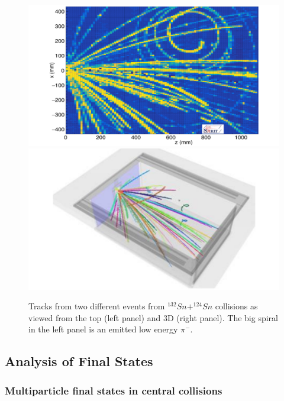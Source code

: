 \documentclass[%
10pt]{article}
\begin{document}
\begin{figure}[htb!]
\centering
\includegraphics[width=0.45\linewidth]{figures/tracks_top_view.pdf}
\includegraphics[width=0.45\linewidth]{figures/tracks_3d_view.pdf}
\caption{
Tracks from two different events from $^{132}Sn+^{124}Sn$ collisions as viewed from the top (left panel) and 3D (right panel). The big spiral in the left panel is an emitted low energy $\pi^-$.
}
\end{figure}

\subsection{Analysis of Final States}

\subsubsection{Multiparticle final states in central collisions}

\vspace{5mm}
\end{document}
